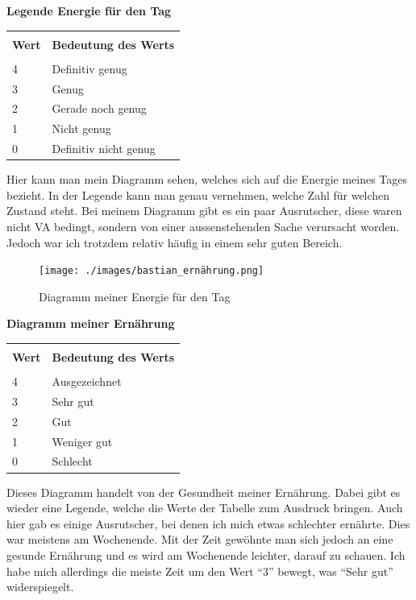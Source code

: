 \pagebreak
\textbf{Legende Energie für den Tag}
\newline
\begin{table}[htp]
  \begin{tabularx}{\textwidth}{l X}\hline \\
    \textbf{Wert} & \textbf{Bedeutung des Werts}  \\\hline \\
    4 & Definitiv genug \\
    3 & Genug \\
    2 & Gerade noch genug \\
    1 & Nicht genug \\
    0 & Definitiv nicht genug
    \\\hline
  \end{tabularx}
\end{table}
\newline
Hier kann man mein Diagramm sehen, welches sich auf die Energie meines Tages bezieht. In der Legende kann man genau vernehmen, welche Zahl für welchen Zustand steht. Bei meinem Diagramm gibt es ein paar Ausrutscher, diese waren nicht VA bedingt, sondern von einer aussenstehenden Sache verursacht worden. Jedoch war ich trotzdem relativ häufig in einem sehr guten Bereich.
\newline
\begin{figure}[H]
  \centering
  \texttt{[image: ./images/bastian\_ernährung.png]}
  \caption{Diagramm meiner Energie für den Tag}
\end{figure}
\textbf{Diagramm meiner Ernährung}
\newline
\begin{table}[htp]
  \begin{tabularx}{\textwidth}{l X}\hline \\
    \textbf{Wert} & \textbf{Bedeutung des Werts}  \\\hline \\
    4 & Ausgezeichnet \\
    3 & Sehr gut \\
    2 & Gut \\
    1 & Weniger gut \\
    0 & Schlecht
    \\\hline
  \end{tabularx}
\end{table}
\newline
Dieses Diagramm handelt von der Gesundheit meiner Ernährung. Dabei gibt es wieder eine Legende, welche die Werte der Tabelle zum Ausdruck bringen. Auch hier gab es einige Ausrutscher, bei denen ich mich etwas schlechter ernährte. Dies war meistens am Wochenende. Mit der Zeit gewöhnte man sich jedoch an eine gesunde Ernährung und es wird am Wochenende leichter, darauf zu schauen. Ich habe mich allerdings die meiste Zeit um den Wert “3” bewegt, was “Sehr gut” widerspiegelt.
